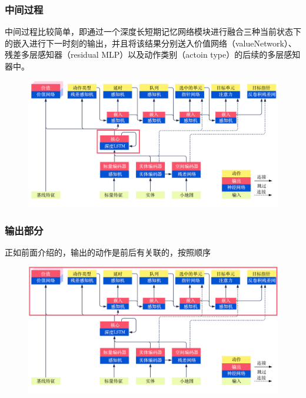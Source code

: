 \subsubsection{中间过程} 

中间过程比较简单，即通过一个深度长短期记忆网络模块进行融合三种当前状态下的嵌入进行下一时刻的输出，并且将该结果分别送入价值网络（valueNetwork）、残差多层感知器（residual MLP）以及动作类别（actoin type）的后续的多层感知器中。

\begin{figure}[htpb]
    \centering
    \includegraphics[width=0.7\linewidth]{res/ch13/13.5}
    \caption{}
    \label{fig:}
\end{figure}

\subsubsection{输出部分} 

正如前面介绍的，输出的动作是前后有关联的，按照顺序

\begin{figure}[htpb]
    \centering
    \includegraphics[width=0.7\linewidth]{res/ch13/13.6}
    \caption{}
    \label{fig:}
\end{figure}


